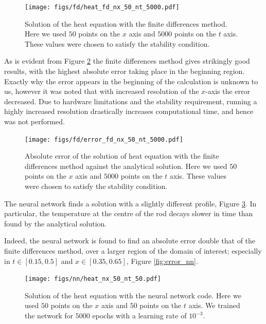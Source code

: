 \documentclass[aps,reprint,superscriptaddress,nofootinbib]{revtex4-2}
\begin{document}
\begin{figure}[htp]
    \centering
    \texttt{[image: figs/fd/heat\_fd\_nx\_50\_nt\_5000.pdf]}
    \caption{Solution of the heat equation with the finite differences method. Here we used \(50\) points on the \(x\) axis and \(5000\) points on the \(t\) axis. These values were chosen to satisfy the stability condition.}
    \label{fig:heat_fd}
\end{figure}

    As is evident from Figure \ref{fig:error_fd} the finite differences method gives strikingly good results, with the highest absolute error taking place in the beginning region. Exactly why the error appears in the beginning of the calculation is unknown to us, however it was noted that with increased resolution of the \(x\)-axis the error decreased. Due to hardware limitations and the stability requirement, running a highly increased resolution drastically increases computational time, and hence was not performed.

\begin{figure}[htp]
    \centering
    \texttt{[image: figs/fd/error\_fd\_nx\_50\_nt\_5000.pdf]}
    \caption{Absolute error of the solution of heat equation with the finite differences method against the analytical solution. Here we used \(50\) points on the \(x\) axis and \(5000\) points on the \(t\) axis. These values were chosen to satisfy the stability condition.}
    \label{fig:error_fd}
\end{figure}

    The neural network finds a solution with a slightly different profile, Figure \ref{fig:heat_nn}. In particular, the temperature at the centre of the rod decays slower in time than found by the analytical solution.
    
    Indeed, the neural network is found to find an absolute error double that of the finite differences method, over a larger region of the domain of interest; especially in \(t \in [0.15, 0.5]\) and \(x \in [0.35, 0.65]\), Figure \ref{fig:error_nn}.

\begin{figure}[htp]
    \centering
    \texttt{[image: figs/nn/heat\_nx\_50\_nt\_50.pdf]}
    \caption{Solution of the heat equation with the neural network code. Here we used \(50\) points on the \(x\) axis and \(50\) points on the \(t\) axis. We trained the network for \(5000\) epochs with a learning rate of \(10^{-3}\).}
    \label{fig:heat_nn}
\end{figure}
\end{document}
